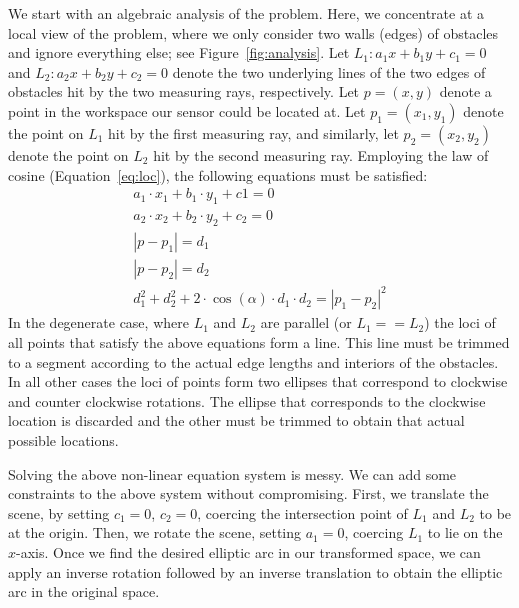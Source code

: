 We start with an algebraic analysis of the problem. Here, we concentrate at a local view of the problem, where we only consider two walls (edges) of obstacles and ignore everything else; see Figure~\ref{fig:analysis}. Let $L_1: a_1 x + b_1 y + c_1 = 0$ and $L_2: a_2 x + b_2 y + c_2 = 0$ denote the two underlying lines of the two edges of obstacles hit by the two measuring rays, respectively. Let $p = (x,y)$ denote a point in the workspace our sensor could be located at. Let $p_1 = (x_1,y_1)$ denote the point on $L_1$ hit by the first measuring ray, and similarly, let $p_2 = (x_2,y_2)$ denote the point on $L_2$ hit by the second measuring ray. Employing the law of cosine (Equation~\ref{eq:loc}), the following equations must be satisfied:
\begin{gather}
  a_1\cdot x_1 + b_1\cdot y_1 + c1 = 0\\
  a_2\cdot x_2 + b_2\cdot y_2 + c_2 = 0\\
  |p - p_1| = d_1\\
  |p - p_2| = d_2\\
  d_1^2 + d_2^2 + 2\cdot \cos(\alpha)\cdot d_1\cdot d_2 = |p_1 - p_2|^2\label{eq:loc}
\end{gather}
In the degenerate case, where $L_1$ and $L_2$ are parallel (or $L_1 == L_2$) the loci of all points that satisfy the above equations form a line. This line must be trimmed to a segment according to the actual edge lengths and interiors of the obstacles. In all other cases the loci of points form two ellipses that correspond to clockwise and counter clockwise rotations. The ellipse that corresponds to the clockwise location is discarded and the other must be trimmed to obtain that actual possible locations.

Solving the above non-linear equation system is messy. We can add some constraints to the above system without compromising. First, we translate the scene, by setting $c_1 = 0$, $c_2 = 0$, coercing the intersection point of $L_1$ and $L_2$ to be at the origin. Then, we rotate the scene, setting $a_1 = 0$, coercing $L_1$ to lie on the $x$-axis. Once we find the desired elliptic arc in our transformed space, we can apply an inverse rotation followed by an inverse translation to obtain the elliptic arc in the original space.

